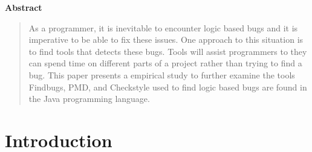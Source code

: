 \author{
        Andreas Landgrebe\\  %
        Department of Computer Science\\
        Allegheny College \\
        {\tt landgrebea@allegheny.edu}  \\  %
        \vspace*{.1in} \today \\ \vspace*{.1in}
}

\maketitle       %

\begin{center}
\large\bf Abstract
\vspace{-1em}  %
\end{center}


\begin{quote}

As a programmer, it is inevitable to encounter logic based bugs and it is imperative to be able to fix these issues. One approach to this situation is to find tools that detects these bugs. Tools will assist programmers to they can spend time on different parts of a project rather than trying to find a bug. This paper presents a empirical study to further examine the  tools Findbugs, PMD, and Checkstyle used to find logic based bugs are found in the Java programming language. 
\end{quote}

\section{Introduction}
\label{sec:introduction}
\vspace*{-.1in}

